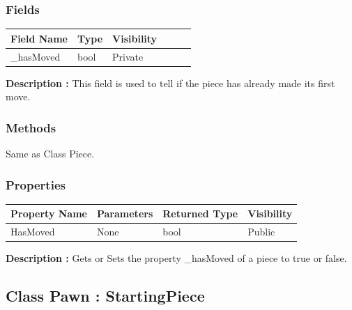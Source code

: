 \documentclass[12pt]{article}
\begin{document}
\subsubsection{Fields}

\begin{table}[H]
    \begin{tabular}{llllll}
    \hline
    \multicolumn{1}{|l|}{\cellcolor[HTML]{EFEFEF}\textbf{Field Name}} & \multicolumn{1}{l|}{\cellcolor[HTML]{EFEFEF}\textbf{Type}} & \multicolumn{1}{l|}{\cellcolor[HTML]{EFEFEF}\textbf{Visibility}} \\ \hline
    \multicolumn{1}{|l|}{\_hasMoved}                                  & \multicolumn{1}{l|}{bool}                                & \multicolumn{1}{l|}{Private}                                     \\ \hline
    \end{tabular}
\end{table}

\textbf{Description :} This field is used to tell if the piece has
already made its first move.

\subsubsection{Methods}
Same as Class Piece.
\subsubsection{Properties}

\begin{table}[H]
    \begin{tabular}{|l|l|l|l|}
    \hline
    \rowcolor[HTML]{EFEFEF} 
    \cellcolor[HTML]{EFEFEF}\textbf{Property Name} & \textbf{Parameters}  & \textbf{Returned Type} & \textbf{Visibility} \\ \hline
    HasMoved                                       & None                 & bool                   & Public              \\ \hline
    \end{tabular}
\end{table}

\textbf{Description :} Gets or Sets the property \_hasMoved of a piece to true or false.
\newpage


\subsection{Class Pawn : StartingPiece}
\end{document}
